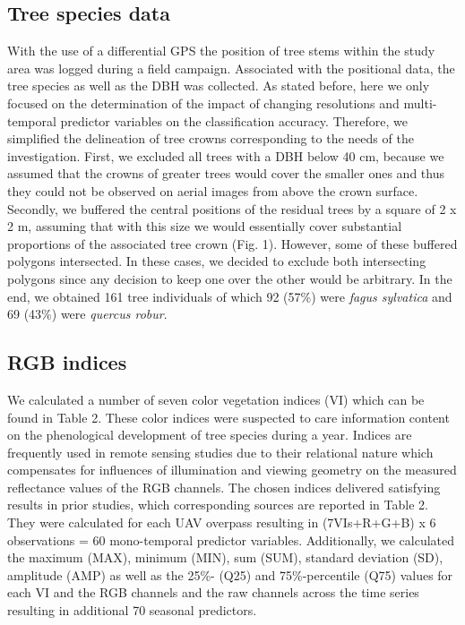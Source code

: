 \documentclass[]{article}
\begin{document}
\hypertarget{tree-species-data}{%
\subsection{Tree species data}\label{tree-species-data}}

With the use of a differential GPS the position of tree stems within the
study area was logged during a field campaign. Associated with the
positional data, the tree species as well as the DBH was collected. As
stated before, here we only focused on the determination of the impact
of changing resolutions and multi-temporal predictor variables on the
classification accuracy. Therefore, we simplified the delineation of
tree crowns corresponding to the needs of the investigation. First, we
excluded all trees with a DBH below 40 cm, because we assumed that the
crowns of greater trees would cover the smaller ones and thus they could
not be observed on aerial images from above the crown surface. Secondly,
we buffered the central positions of the residual trees by a square of 2
x 2 m, assuming that with this size we would essentially cover
substantial proportions of the associated tree crown (Fig. 1). However,
some of these buffered polygons intersected. In these cases, we decided
to exclude both intersecting polygons since any decision to keep one
over the other would be arbitrary. In the end, we obtained 161 tree
individuals of which 92 (57\%) were \emph{fagus sylvatica} and 69 (43\%)
were \emph{quercus robur}.

\hypertarget{rgb-indices}{%
\subsection{RGB indices}\label{rgb-indices}}

We calculated a number of seven color vegetation indices (VI) which can
be found in Table 2. These color indices were suspected to care
information content on the phenological development of tree species
during a year. Indices are frequently used in remote sensing studies due
to their relational nature which compensates for influences of
illumination and viewing geometry on the measured reflectance values of
the RGB channels. The chosen indices delivered satisfying results in
prior studies, which corresponding sources are reported in Table 2. They
were calculated for each UAV overpass resulting in (7VIs+R+G+B) x 6
observations = 60 mono-temporal predictor variables. Additionally, we
calculated the maximum (MAX), minimum (MIN), sum (SUM), standard
deviation (SD), amplitude (AMP) as well as the 25\%- (Q25) and
75\%-percentile (Q75) values for each VI and the RGB channels and the
raw channels across the time series resulting in additional 70 seasonal
predictors.
\end{document}
